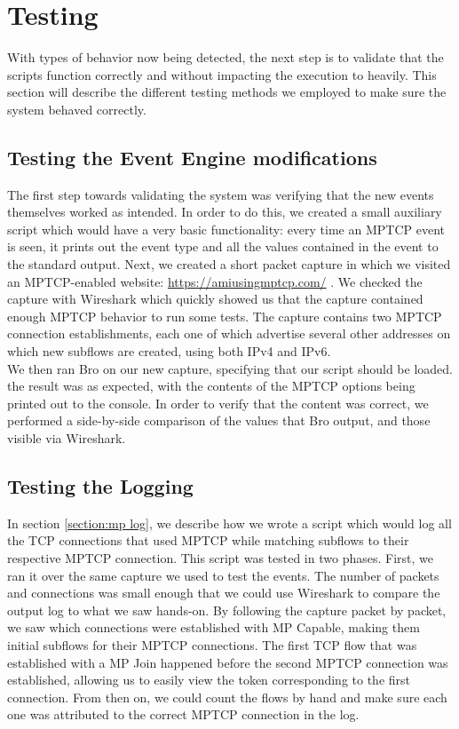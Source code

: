 

\chapter{Testing} \label{chap:test}
With types of behavior now being detected, the next step is to validate that the scripts function correctly and without impacting the execution to heavily. This section will describe the different testing methods we employed to make sure the system behaved correctly.

\section{Testing the Event Engine modifications}
The first step towards validating the system was verifying that the new events themselves worked as intended. In order to do this, we created a small auxiliary script which would have a very basic functionality: every time an MPTCP event is seen, it prints out the event type and all the values contained in the event to the standard output. Next, we created a short packet capture in which we visited an MPTCP-enabled website: \url {https://amiusingmptcp.com/} \cite{amiusing}. We checked the capture with Wireshark \citep{wireshark} which quickly showed us that the capture contained enough MPTCP behavior to run some tests. The capture contains two MPTCP connection establishments, each one of which advertise several other addresses on which new subflows are created, using both IPv4 and IPv6. \\

We then ran Bro on our new capture, specifying that our script should be loaded. the result was as expected, with the contents of the MPTCP options being printed out to the console. In order to verify that the content was correct, we performed a side-by-side comparison of the values that Bro output, and those visible via Wireshark.

\section{Testing the Logging}
In section \ref{section:mp log}, we describe how we wrote a script which would log all the TCP connections that used MPTCP while matching subflows to their respective MPTCP connection. This script was tested in two phases. First, we ran it over the same capture we used to test the events. The number of packets and connections was small enough that we could use Wireshark to compare the output log to what we saw hands-on. By following the capture packet by packet, we saw which connections were established with MP Capable, making them initial subflows for their MPTCP connections. The first TCP flow that was established with a MP Join happened before the second MPTCP connection was established, allowing us to easily view the token corresponding to the first connection. From then on, we could count the flows by hand and make sure each one was attributed to the correct MPTCP connection in the log. \\

